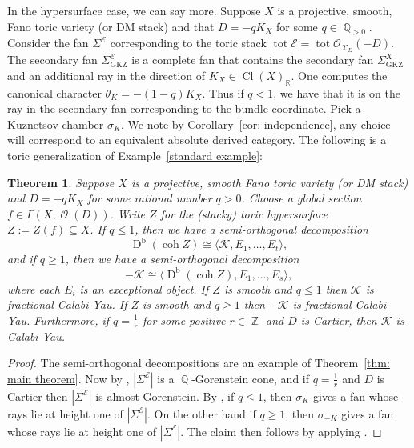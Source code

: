 \documentclass[reqno, 12pt]{amsart}
\newtheorem{theorem}{Theorem}[section]
\theoremstyle{definition}
\newcommand{\op}[1]{\operatorname{#1}}
\newcommand{\dbcoh}[1]{\operatorname{D}^{\operatorname{b}}(\operatorname{coh }#1)}
\newcommand{\dabs}{\op{D}^{\op{abs}}}
\def\Z{\op{\mathbb{Z}}}
\def\R{\op{\mathbb{R}}}
\def\Q{\op{\mathbb{Q}}}
\def\O{\op{\mathcal{O}}}
\numberwithin{equation}{section}
\begin{document}
In the hypersurface case, we can say more.  Suppose $X$ is a projective, smooth, Fano toric variety (or DM stack) and that $D = -qK_{X}$ for some $q \in \Q_{>0}$. Consider the fan $\Sigma^{\mathcal{E}}$ corresponding to the toric stack $\op{tot} \mathcal{E} = \op{tot} \mathcal{O}_{\mathcal{X}_\Sigma}(-D)$. The secondary fan $\Sigma^{\mathcal E}_{\op{GKZ}}$ is a complete fan that contains the secondary fan $\Sigma^X_{\op{GKZ}}$ and an additional ray in the direction of $K_{X} \in \op{Cl}(X)_{\R}$. One computes the canonical character $\theta_K = -(1-q)K_{X}$. Thus if $q <1$, we have that it is on the ray in the secondary fan corresponding to the bundle coordinate. Pick a Kuznetsov chamber $\sigma_K$. We note by Corollary~\ref{cor: independence}, any choice will correspond to an equivalent absolute derived category.  The following is a toric generalization of Example~\ref{standard example}:
\begin{theorem}\label{thm: Fano CY category}
  Suppose $X$ is a projective, smooth Fano toric variety (or DM stack) and $D = -qK_{X}$ for some rational number $q > 0$. Choose a global section $f \in \Gamma(X, \O(D))$. Write $Z$ for the (stacky) toric hypersurface $ Z:=Z(f) \subseteq X$. If $q \leq 1$, then we have a semi-orthogonal decomposition
  $$
  \dbcoh{Z} \cong \langle \mathcal K , E_1, \dots, E_t\rangle,
  $$
  and if $q \geq 1$, then we have a semi-orthogonal decomposition
    $$
  -\mathcal K  \cong \langle\dbcoh{Z}, E_1, \dots, E_s\rangle,
  $$
  where each $E_i$ is an exceptional object.
  If $Z$ is smooth and $q\leq 1$ then $\mathcal K$  is fractional Calabi-Yau.   If $Z$ is smooth and $q\geq 1$ then $-\mathcal K$  is fractional Calabi-Yau.  Furthermore, if $q = \frac{1}{r}$ for some positive $r \in \Z$ and $D$ is Cartier, then $\mathcal K$ is Calabi-Yau. 
\end{theorem}

\begin{proof}
The semi-orthogonal decompositions are an example of Theorem~\ref{thm: main theorem}. %
Now by \cite[Proposition 4.9]{FK18}, $|\Sigma^{\mathcal{E}}|$ is a $\Q$-Gorenstein cone, and if $q = \tfrac{1}{r}$ and $D$ is Cartier then $|\Sigma^{\mathcal{E}}|$ is almost Gorenstein.
By \cite[Lemma 4.24]{FK18}, if $q \leq 1$, then $\sigma_K$ gives a fan whose rays lie at height one of $|\Sigma^{\mathcal{E}}|$.  On the other hand if $q \geq 1$, then $\sigma_{-K}$ gives a fan whose rays lie at height one of $|\Sigma^{\mathcal{E}}|$.
  The claim then follows by applying \cite[Corollary 5.6]{FK18}.
\end{proof}
\end{document}
